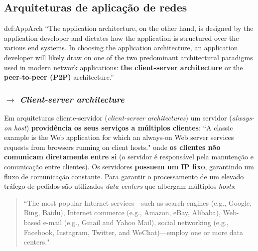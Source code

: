 \subsection[2.1 Arquiteturas de aplicação de redes]{\hspace*{0.075 em}\raisebox{0.2 em}{$\pmb{\drsh}$}  Arquiteturas de aplicação de redes}
\label{subsec:arquitetura-aplicacao-redes}

\begin{theo}{def:AppArch}\label{def:AppArch}
    ``The application architecture, on the other hand, is designed by the application developer and dictates how the application is structured over the various end systems. In choosing the application architecture, an application developer will likely draw on one of the two predominant architectural paradigms used in modern network applications: \textbf{the client-server architecture} or the \textbf{peer-to-peer (P2P)} architecture.''\cite{Kurose2017}
\end{theo}

\subsubsection[2.1.1 Client-server architecture]{$\pmb{\rightarrow}$ \textit{Client-server architecture}}

Em arquiteturas cliente-servidor (\textit{client-server architectures}) um servidor (\textit{always-on host}) \textbf{providência os seus serviços a múltiplos clientes}: ``A classic example is the Web application for which an always-on Web server services requests from browsers running on client hosts." onde \textbf{os clientes não comunicam diretamente entre si} (o servidor é responsável pela manutenção e comunicação entre clientes). Os servidores \textbf{possuem um IP fixo}, garantindo um fluxo de comunicação constante. Para garantir o processamento de um elevado tráfego de pedidos são utilizados \textit{data centers} que albergam múltiplos \textit{hosts}:

\begin{quote}
    ``The most popular Internet services—such as search engines (e.g., Google, Bing, Baidu), Internet commerce (e.g., Amazon, eBay, Alibaba), Web-based e-mail (e.g., Gmail and Yahoo Mail), social networking (e.g., Facebook, Instagram, Twitter, and WeChat)—employ one or more data centers."\cite{Kurose2017}
\end{quote}

